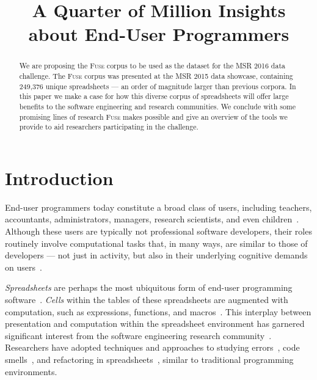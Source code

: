 \documentclass[conference]{IEEEtran}
\newcommand{\xlscount}{249,376}
\begin{document}
\title{A Quarter of Million Insights about End-User Programmers}

\author{
}


\maketitle

\begin{abstract}
We are proposing the \textsc{Fuse} corpus to be used as the dataset for the MSR 2016 data challenge.
The \textsc{Fuse} corpus was presented at the MSR 2015 data showcase, containing \xlscount{} unique spreadsheets --- an order of magnitude larger than previous corpora.
In this paper we make a case for how this diverse corpus of spreadsheets will offer large benefits to the software engineering and research communities.
We conclude with some promising lines of research \textsc{Fuse} makes possible and give an overview of the tools we provide to aid researchers participating in the challenge.

\end{abstract}


\IEEEpeerreviewmaketitle

\section{Introduction}

End-user programmers today constitute a broad class of users, including teachers, accountants, administrators, managers, research scientists, and even children~\cite{Ko2011}.
Although these users are typically not professional software developers, their roles routinely involve computational tasks that, in many ways, are similar to those of developers --- not just in activity, but also in their underlying cognitive demands on users~\cite{Blackwell2002}. 

\emph{Spreadsheets} are perhaps the most ubiquitous form of end-user programming software~\cite{Scaffidi2005}. \emph{Cells} within the tables of these spreadsheets are augmented with computation, such as expressions, functions, and macros~\cite{Nardi1990}. 
This interplay between presentation and computation within the spreadsheet environment has garnered significant interest from the software engineering research community~\cite{Burnett2009}. 
Researchers have adopted techniques and approaches to studying errors~\cite{Powell2008}, code smells~\cite{Pinzger2012}, and refactoring in spreadsheets~\cite{Badame2012}, similar to traditional programming environments. 
\end{document}
